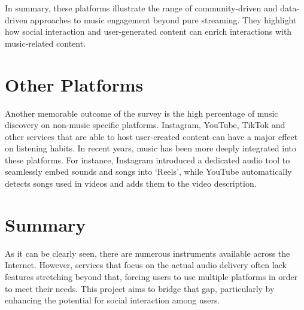 In summary, these platforms illustrate the range of community-driven and data-driven approaches to music engagement
beyond pure streaming.
They highlight how social interaction and user-generated content can enrich interactions with music-related content.


\section{Other Platforms}
Another memorable outcome of the survey is the high percentage of music discovery on non-music specific platforms.
Instagram, YouTube, TikTok and other services that are able to host user-created content can have a major effect on
listening habits. In recent years, music has been more deeply integrated into these platforms.
For instance, Instagram introduced a dedicated audio tool to seamlessly embed sounds and songs into ‘Reels’\cite{inst_audio},
while YouTube automatically detects songs used in videos and adds them to the video description.


\section*{Summary}
As it can be clearly seen, there are numerous instruments available across the Internet.
However, services that focus on the actual audio delivery often lack features stretching beyond that,
forcing users to use multiple platforms in order to meet their needs. This project aims to bridge that gap,
particularly by enhancing the potential for social interaction among users.

